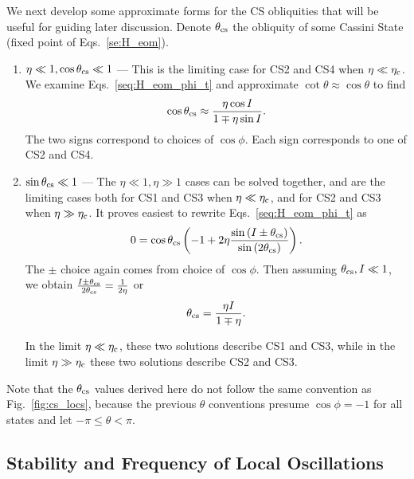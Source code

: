 \documentclass[
        fleqn,
        usenatbib,
        referee,
    ]{mnras}
\newcommand*{\p}[1]{\left(#1\right)}
\begin{document}
We next develop some approximate forms for the CS obliquities that will be
useful for guiding later discussion. Denote $\theta_{\rm cs}$ the obliquity of
some Cassini State (fixed point of Eqs.~\eqref{se:H_eom}).
\begin{enumerate}
    \item $\eta \ll 1, \cos \theta_{\rm cs} \ll 1$ --- This is the limiting case
        for CS2 and CS4 when $\eta \ll \eta_{\rm c}$. We examine
        Eqs.~\eqref{seq:H_eom_phi_t} and approximate $\cot \theta \approx \cos
        \theta$ to find
        \begin{equation}
            \cos \theta_{\rm cs} \approx \frac{\eta \cos I}
                {1 \mp \eta \sin I}.
        \end{equation}
        The two signs correspond to choices of $\cos \phi$. Each sign
        corresponds to one of CS2 and CS4.

    \item $\sin \theta_{\rm cs} \ll 1$ --- The $\eta \ll 1, \eta \gg 1$ cases
        can be solved together, and are the limiting cases both for CS1 and CS3
        when $\eta \ll \eta_{\rm c}$, and for CS2 and CS3 when $\eta \gg
        \eta_{\rm c}$. It proves easiest to rewrite Eqs.~\eqref{seq:H_eom_phi_t}
        as
        \begin{equation}
            0 = \cos \theta_{\rm cs}\p{-1 + 2\eta
                \frac{\sin \p{I \pm \theta_{\rm cs}}}{\sin \p{2\theta_{\rm
                    cs}}}}.\label{eq:rewritten_dphi}
        \end{equation}
        The $\pm$ choice again comes from choice of $\cos \phi$. Then assuming
        $\theta_{\rm cs}, I \ll 1$, we obtain $\frac{I \pm
        \theta_{\rm cs}}{2\theta_{\rm cs}} = \frac{1}{2\eta}$ or
        \begin{equation}
            \theta_{\rm cs} = \frac{\eta I}{1 \mp \eta}.
        \end{equation}

        In the limit $\eta \ll \eta_{\rm c}$, these two solutions describe CS1
        and CS3, while in the limit $\eta \gg \eta_{\rm c}$ these two solutions
        describe CS2 and CS3.
\end{enumerate}
Note that the $\theta_{\rm cs}$ values derived here do not follow the same
convention as Fig.~\ref{fig:cs_locs}, because the previous $\theta$ conventions
presume $\cos \phi = -1$ for all states and let $-\pi \leq \theta < \pi$.

\subsection{Stability and Frequency of Local Oscillations}\label{ss:eigens}
\end{document}

